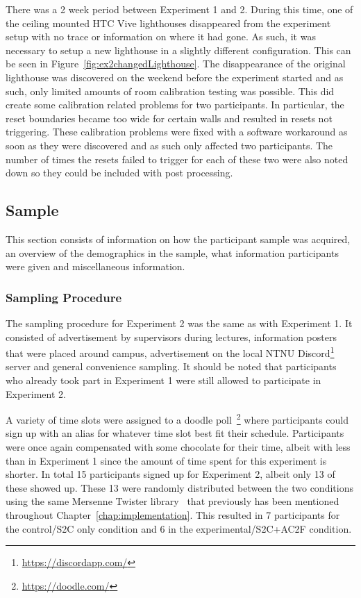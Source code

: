 There was a 2 week period between Experiment 1 and 2. During this time, one of the ceiling mounted HTC Vive lighthouses disappeared from the experiment setup with no trace or information on where it had gone. As such, it was necessary to setup a new lighthouse in a slightly different configuration. This can be seen in Figure~\ref{fig:ex2changedLighthouse}. The disappearance of the original lighthouse was discovered on the weekend before the experiment started and as such, only limited amounts of room calibration testing was possible. This did create some calibration related problems for two participants. In particular, the reset boundaries became too wide for certain walls and resulted in resets not triggering. These calibration problems were fixed with a software workaround as soon as they were discovered and as such only affected two participants. The number of times the resets failed to trigger for each of these two were also noted down so they could be included with post processing. 

\subsection{Sample}
This section consists of information on how the participant sample was acquired, an overview of the demographics in the sample, what information participants were given and miscellaneous information. 
   
\subsubsection{Sampling Procedure}
The sampling procedure for Experiment 2 was the same as with Experiment 1. It consisted of advertisement by supervisors during lectures, information posters that were  placed around campus, advertisement on the local NTNU Discord\footnote{\url{https://discordapp.com/}} server and general convenience sampling. It should be noted that participants who already took part in Experiment 1 were still allowed to participate in Experiment 2.

A variety of time slots were assigned to a doodle poll~\footnote{\url{https://doodle.com/}} where participants could sign up with an alias for whatever time slot best fit their schedule. Participants were once again compensated with some chocolate for their time, albeit with less than in Experiment 1 since the amount of time spent for this experiment is shorter. In total 15 participants signed up for Experiment 2, albeit only 13 of these showed up. These 13 were randomly distributed between the two conditions using the same Mersenne Twister library~\cite{MersenneTwisterLibraryLink} that previously has been mentioned throughout Chapter~\ref{chap:implementation}. This resulted in 7 participants for the control/S2C only condition and 6 in the experimental/S2C+AC2F condition. 

